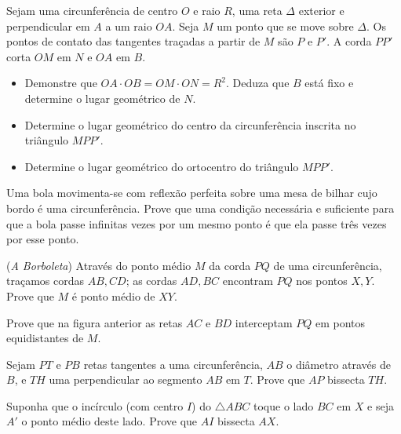 \begin{questao}
  Sejam uma circunferência de centro $O$ e raio $R$, uma
  reta $\Delta$ exterior e perpendicular em $A$ a um raio
  $OA$. Seja $M$ um ponto que se move sobre $\Delta$. Os pontos
  de contato das tangentes traçadas a partir de $M$ são $P$ e
  $P'$. A corda $PP'$ corta $OM$ em $N$ e $OA$ em $B$.
  \begin{itemize}
    \item Demonstre que $OA \cdot OB = OM \cdot ON = R^2$. Deduza
    que  $B$ está fixo e determine o lugar geométrico de $N$.

    \item Determine o lugar geométrico do centro da circunferência
    inscrita no triângulo $MPP'$.

    \item Determine o lugar geométrico do ortocentro do triângulo
    $MPP'$.
  \end{itemize}
\end{questao}

\begin{questao}
  Uma bola movimenta-se com reflexão perfeita sobre uma mesa
  de bilhar cujo bordo é uma circunferência. Prove que uma condição
  necessária e suficiente para que a bola passe infinitas vezes por um
  mesmo ponto é que ela passe três vezes por esse ponto.
\end{questao}

\begin{questao}
  ({\it A Borboleta}) Através do ponto médio $M$ da corda
  $PQ$ de uma circunferência, traçamos cordas $AB,CD$; as
  cordas $AD,BC$ encontram $PQ$ nos pontos $X,Y$. Prove que
  $M$ é ponto médio de $XY$.
\end{questao}

\begin{questao}
  Prove que na figura anterior as retas $AC$ e $BD$
  interceptam $PQ$ em pontos equidistantes de $M$.
\end{questao}

\begin{questao}
  Sejam $PT$ e $PB$ retas tangentes a uma
  circunferência, $AB$ o diâmetro através de $B$, e $TH$ uma
  perpendicular ao segmento $AB$ em $T$. Prove que $AP$ bissecta
  $TH$.
\end{questao}

\begin{questao}
  Suponha que o incírculo (com centro $I$) do $\triangle
  ABC$ toque o lado $BC$ em $X$ e seja $A'$ o ponto médio deste
  lado. Prove que $AI$ bissecta $AX$.
\end{questao}

